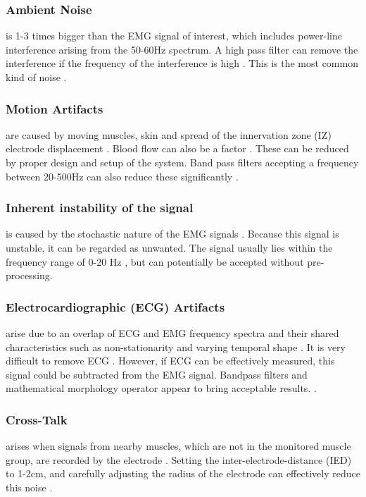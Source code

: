\documentclass{article}
\begin{document}
\subsubsection{Ambient Noise} is 1-3 times bigger than the EMG signal of interest, which includes power-line interference arising from the 50-60Hz spectrum. A high pass filter can remove the interference if the frequency of the interference is high \cite{Nazmi2016}. This is the most common kind of noise \cite{Sulaiman2016}.
\subsubsection{Motion Artifacts} are caused by moving muscles, skin and spread of the innervation zone (IZ) electrode displacement \cite{Reaz2006} \cite{Chowdhury2013} \cite{Masuda1985}. Blood flow can also be a factor \cite{Luca2002a}. These can be reduced by proper design and setup of the system. Band pass filters accepting a frequency between 20-500Hz can also reduce these significantly \cite{Balbinot2013} \cite{El-Khoury2015}.
\subsubsection{Inherent instability of the signal} is caused by the stochastic nature of the EMG signals \cite{Chowdhury2013}. Because this signal is unstable, it can be regarded as unwanted. The signal usually lies within the frequency range of 0-20 Hz \cite{Nazmi2016}, but can potentially be accepted without pre-processing.
\subsubsection{Electrocardiographic (ECG) Artifacts} arise due to an overlap of ECG and EMG frequency spectra and their shared characteristics such as non-stationarity and varying temporal shape \cite{Reaz2006} \cite{Chowdhury2013}. It is very difficult to remove ECG \cite{Nazmi2016}. However, if ECG can be effectively measured, this signal could be subtracted from the EMG signal. Bandpass filters and mathematical morphology operator appear to bring acceptable results. \cite{Abbaspour} \cite{Nazmi2016}.
\subsubsection{Cross-Talk} arises when signals from nearby muscles, which are not in the monitored muscle group, are recorded by the electrode \cite{Chowdhury2013}. Setting the inter-electrode-distance (IED) to 1-2cm,  and carefully adjusting the radius of the electrode can effectively reduce this noise \cite{Nazmi2016}. 
\end{document}
